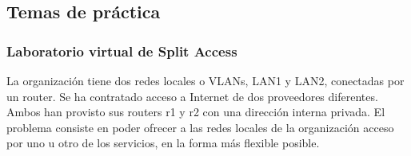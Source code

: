 \subsection{Temas de práctica}
\subsubsection{Laboratorio virtual de Split Access}
La organización tiene dos redes locales o VLANs, LAN1 y LAN2, conectadas por un router. Se ha contratado acceso a Internet de dos proveedores diferentes. Ambos han provisto sus routers r1 y r2 con una dirección interna privada. El problema consiste en poder ofrecer a las redes locales de la organización acceso por uno u otro de los servicios, en la forma más flexible posible. 


